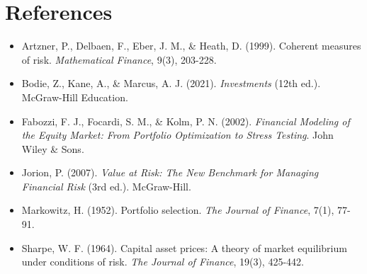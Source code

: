 \section{References}

\begin{itemize}
  \item Artzner, P., Delbaen, F., Eber, J. M., \& Heath, D. (1999). Coherent measures of risk. \textit{Mathematical Finance}, 9(3), 203-228.
  \item Bodie, Z., Kane, A., \& Marcus, A. J. (2021). \textit{Investments} (12th ed.). McGraw-Hill Education.
  \item Fabozzi, F. J., Focardi, S. M., \& Kolm, P. N. (2002). \textit{Financial Modeling of the Equity Market: From Portfolio Optimization to Stress Testing}. John Wiley \& Sons.
  \item Jorion, P. (2007). \textit{Value at Risk: The New Benchmark for Managing Financial Risk} (3rd ed.). McGraw-Hill.
  \item Markowitz, H. (1952). Portfolio selection. \textit{The Journal of Finance}, 7(1), 77-91.
  \item Sharpe, W. F. (1964). Capital asset prices: A theory of market equilibrium under conditions of risk. \textit{The Journal of Finance}, 19(3), 425-442.
\end{itemize}
